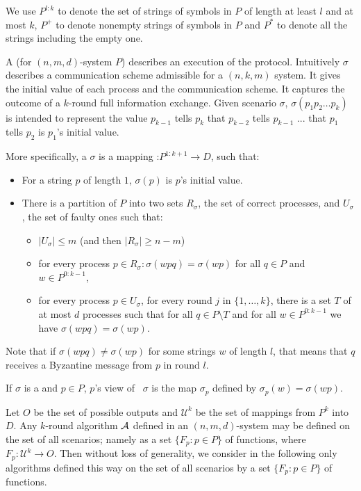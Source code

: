 {{We use $P^{l:k}$ to denote the set of strings of symbols in $P$ of length at least $l$ 
and at most $k$, $P^{+}$ to denote nonempty strings of symbols in $P$
and $P^{*}$ to denote all the strings including the empty one.

 A {} (for $(n,m,d)$-system $P$) describes an
 execution of the protocol. Intuitively  $\sigma$ describes a 
 communication scheme admissible for a $(n,k,m)$ system.
 It gives the initial value of each process and the communication scheme.
It captures the outcome of a $k$-round full information exchange.
Given scenario $\sigma$, 
$\sigma ( p_{1}
p_{2} \ldots p_{k} )$ is intended to represent the value $p_{k-1}$
tells $p_k$ that $p_{k-2}$ tells $p_{k-1}$ ... that $p_1$ tells $p_2$
is $p_1$'s initial value. 

 More specifically,  a  {} $\sigma$
  is a mapping :$P^{1:k+1}
\rightarrow D$, such that:
\begin{itemize}
\item
For a string $p$ of length $1$, $\sigma(p)$ is $p$'s initial value. 
\item
There is a partition of $P$ into two sets $R_{\sigma} $, the set of
correct processes,  and $U_\sigma$, the set of faulty ones
such that:
\begin{itemize}
\item
$|U_\sigma| \leq m$ (and then $|R_\sigma|\geq n-m$)
\item
for every  process $p\in R_{\sigma} : \sigma(w p q) = \sigma(w p)$ for all
$q\in P$ and $w\in P^{0:k-1}$,  
\item
for every process $p\in U_\sigma$,  for every round $j$ in $\{1,\ldots
, k\}$,  there is a set $T$ of at most $d$ processes such that for
all $q\in P\setminus T$  and for all
$w\in P^{0:k-1}$ we have $\sigma(w p q) = \sigma(w p)$.
\end{itemize}
\end{itemize}
Note that if  $\sigma(wpq) \neq \sigma(wp)$ for some strings $w$ of
length $l$, that means that $q$  receives a Byzantine message from $p$
in round $l$.



If $\sigma$ is a
{} and $p \in P$, $p$'s view of \ $\sigma$ is
the map $\sigma_p$ defined by 
$\sigma_{p} ( w ) = \sigma ( w p )$. 


Let $O$ be the set of possible outputs and $\mathcal{U}^{k}$ be the
set of mappings from $P^{k}$ into $D$.
Any $k$-round algorithm $\cal A$ defined in an $(n,m,d)$-system
may be defined  on the set of all scenarios; namely as a set $\{ F_{p}
: p \in P \}$ of functions, 
where $F_{p} : \mathcal{U}^{k}  \rightarrow O$. 
Then without loss of generality, we consider in the following only algorithms
defined this way on the set of all scenarios by a set $\{ F_{p}
: p \in P \}$ of functions.

}}
